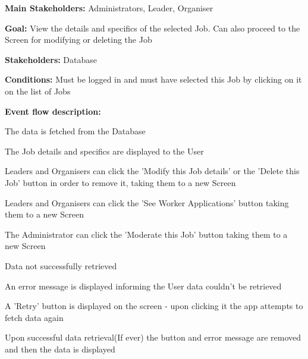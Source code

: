 				\noindent {}
				\begin{packed_item}
					\item \textbf{Main Stakeholders:} Administrators, Leader, Organiser
					\item \textbf{Goal:} View the details and specifics of the selected Job. Can also proceed to the Screen for modifying or deleting the Job
					\item \textbf{Stakeholders: } Database
					\item \textbf{Conditions: } Must be logged in and must have selected this Job by clicking on it on the list of Jobs
					\item \textbf{Event flow description: }
					\begin{packed_enum}
						\item The data is fetched from the Database
						\item The Job details and specifics are displayed to the User
						\item Leaders and Organisers can click the 'Modify this Job details' or the 'Delete this Job' button in order to remove it, taking them to a new Screen
						\item Leaders and Organisers can click the 'See Worker Applications' button taking them to a new Screen
						\item The Administrator can click the 'Moderate this Job' button taking them to a new Screen
					\end{packed_enum}
				
					\begin{packed_item}
						\item[1.a] Data not successfully retrieved
						\item[] \begin{packed_enum}
							\item An error message is displayed informing the User data couldn't be retrieved
							\item A 'Retry' button is displayed on the screen - upon clicking it the app attempts to fetch data again
							\item Upon successful data retrieval(If ever) the button and error message are removed and then the data is displayed
						\end{packed_enum}
					\end{packed_item}
				\end{packed_item}
				
